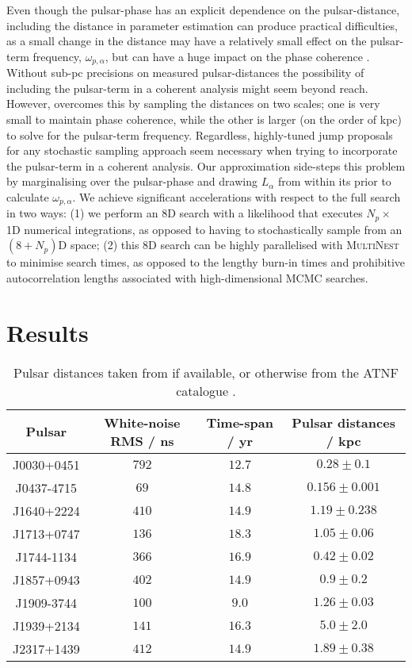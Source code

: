 \documentclass[prd,twocolumn,showpacs,nofootinbib]{revtex4}
\begin{document}
Even though the pulsar-phase has an explicit dependence on the pulsar-distance, including the distance in parameter estimation can produce practical difficulties, as a small change in the distance may have a relatively small effect on the pulsar-term frequency, $\omega_{p,\alpha}$, but can have a huge impact on the phase coherence \citep{corbin-cornish-2010,ellisbayesian2013}. Without sub-pc precisions on measured pulsar-distances the possibility of including the pulsar-term in a coherent analysis might seem beyond reach. However, \citet{ellisbayesian2013} overcomes this by sampling the distances on two scales; one is very small to maintain phase coherence, while the other is larger (on the order of kpc) to solve for the pulsar-term frequency. Regardless, highly-tuned jump proposals for any stochastic sampling approach seem necessary when trying to incorporate the pulsar-term in a coherent analysis. Our approximation side-steps this problem by marginalising over the pulsar-phase and drawing $L_{\alpha}$ from within its prior to calculate $\omega_{p,\alpha}$. We achieve significant accelerations with respect to the full search in two ways: (1) we perform an 8D search with a likelihood that executes $N_p\times$1D numerical integrations, as opposed to having to stochastically sample from an $(8+N_p)$D space; (2) this 8D search can be highly parallelised with \textsc{MultiNest} to minimise search times, as opposed to the lengthy burn-in times and prohibitive autocorrelation lengths associated with high-dimensional MCMC searches.

\section{Results} \label{sec:singlesourceresults}

\begin{table*}
\caption{\label{tab:9PsrInfo}Pulsar distances taken from \citet{verbiest-psr-distances} if available, or otherwise from the ATNF catalogue \citep{ATNF-cat}.}
\centering
\begin{tabular}{c c c c}
\hline
Pulsar & White-noise RMS / ns & Time-span / yr & Pulsar distances / kpc\\
\hline
J0030+0451 & $792$ & $12.7$ & $0.28\pm0.1$ \\
J0437-4715 & $69$ & $14.8$ & $0.156\pm0.001$ \\
J1640+2224 & $410$ & $14.9$ & $1.19\pm0.238$ \\
J1713+0747 & $136$ & $18.3$ & $1.05\pm0.06$ \\
J1744-1134 & $366$ & $16.9$ & $0.42\pm0.02$ \\
J1857+0943 & $402$ & $14.9$ & $0.9\pm0.2$ \\
J1909-3744 & $100$ & $9.0$ & $1.26\pm0.03$ \\
J1939+2134 & $141$ & $16.3$ & $5.0\pm2.0$ \\
J2317+1439 & $412$ & $14.9$ & $1.89\pm0.38$ \\
\hline
\end{tabular}
\end{table*}
\end{document}
